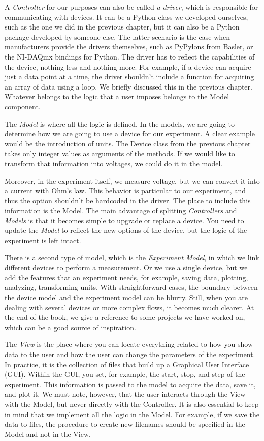 A \emph{Controller} for our purposes can also be called \emph{a driver}, which is responsible for communicating with devices. It can be a Python class we developed ourselves, such as the one we did in the previous chapter, but it can also be a Python package developed by someone else. The latter scenario is the case when manufacturers provide the drivers themselves, such as PyPylons from Basler, or the NI-DAQmx bindings for Python. The driver has to reflect the capabilities of the device, nothing less and nothing more. For example, if a device can acquire just a data point at a time, the driver shouldn't include a function for acquiring an array of data using a loop. We briefly discussed this in the previous chapter. Whatever belongs to the logic that a user imposes belongs to the Model component.

The \emph{Model} is where all the logic is defined. In the models, we are going to determine how we are going to use a device for our experiment. A clear example would be the introduction of units. The Device class from the previous chapter takes only integer values as arguments of the methods. If we would like to transform that information into voltages, we could do it in the model.

Moreover, in the experiment itself, we measure voltage, but we can convert it into a current with Ohm's law. This behavior is particular to our experiment, and thus the option shouldn't be hardcoded in the driver. The place to include this information is the Model. The main advantage of splitting \emph{Controllers} and \emph{Models} is that it becomes simple to upgrade or replace a device. You need to update the \emph{Model} to reflect the new options of the device, but the logic of the experiment is left intact.

There is a second type of model, which is the \emph{Experiment Model}, in which we link different devices to perform a measurement. Or we use a single device, but we add the features that an experiment needs, for example, saving data, plotting, analyzing, transforming units. With straightforward cases, the boundary between the device model and the experiment model can be blurry. Still, when you are dealing with several devices or more complex flows, it becomes much clearer. At the end of the book, we give a reference to some projects we have worked on, which can be a good source of inspiration.

The \emph{View} is the place where you can locate everything related to how you show data to the user and how the user can change the parameters of the experiment. In practice, it is the collection of files that build up a Graphical User Interface ({GUI}). Within the {GUI}, you set, for example, the start, stop, and step of the experiment. This information is passed to the model to acquire the data, save it, and plot it. We must note, however, that the user interacts through the View with the Model, but never directly with the Controller. It is also essential to keep in mind that we implement all the logic in the Model. For example, if we save the data to files, the procedure to create new filenames should be specified in the Model and not in the View.

